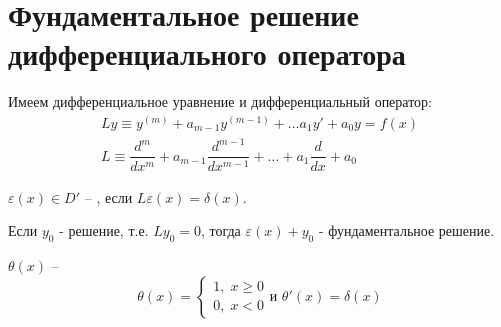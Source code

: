 \section*{Фундаментальное решение дифференциального оператора}

Имеем дифференциальное уравнение и дифференциальный оператор:
$$\begin{gathered}
	Ly \equiv y^{(m)} + a_{m - 1}y^{(m - 1)} + \dots a_1y' + a_0y = f(x) \\
	L \equiv \dfrac{d^m}{dx^m} + a_{m - 1}\dfrac{d^{m - 1}}{dx^{m - 1}} + \dots + a_1\dfrac{d}{dx} + a_0
\end{gathered}$$

\begin{definition}
	$ \varepsilon(x) \in D' $ -- , если $ L\varepsilon(x) = \delta(x) $.
\end{definition}

\begin{remark}
	Если $y_0$ - решение, т.е. $Ly_0 = 0$, тогда $\varepsilon(x) + y_0$ - фундаментальное решение.
\end{remark}

\begin{definition}
	$ \theta(x) $ -- 
	$$\theta(x) = 
	\begin{cases}
		1, \; x \geq 0\\
		0, \; x < 0
	\end{cases} \text{и } \theta'(x) = \delta(x)$$
\end{definition}

